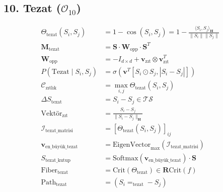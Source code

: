 \documentclass[11pt, a4paper]{article}
\begin{document}
\subsection{10. Tezat ($\mathcal{O}_{10}$)}
\begin{align}
\Theta_{\text{tezat}}(S_i, S_j) &= 1 - \cos(S_i, S_j) = 1 - \frac{\langle S_i, S_j \rangle_{\mathbf{H}}}{\|S_i\| \|S_j\|} \\
\mathbf{M}_{\text{tezat}} &= \mathbf{S} \cdot \mathbf{W}_{\text{opp}} \cdot \mathbf{S}^T \\
\mathbf{W}_{\text{opp}} &= -I_{d \times d} + \mathbf{v}_{\text{zıt}} \otimes \mathbf{v}_{\text{zıt}}^T \\
P(\text{Tezat} \mid S_i, S_j) &= \sigma\left( \mathbf{v}^T [S_i \odot S_j, |S_i - S_j|] \right) \\
\mathcal{C}_{\text{zıtlık}} &= \max_{i,j} \Theta_{\text{tezat}}(S_i, S_j) \\
\Delta S_{\text{tezat}} &= S_i - S_j \in \mathcal{T}\mathcal{S} \\
\text{Vektör}_{\text{zıt}} &= \frac{S_i - S_j}{\|S_i - S_j\|_{\mathbf{H}}} \\
\mathcal{I}_{\text{tezat\_matrisi}} &= \left[ \Theta_{\text{tezat}}(S_i, S_j) \right]_{ij} \\
\mathbf{v}_{\text{en\_büyük\_tezat}} &= \text{EigenVector}_{\max}(\mathcal{I}_{\text{tezat\_matrisi}}) \\
S_{\text{tezat\_kutup}} &= \text{Softmax}(\mathbf{v}_{\text{en\_büyük\_tezat}}) \cdot \mathbf{S} \\
\text{Fiber}_{\text{tezat}} &= \text{Crit}(\Theta_{\text{tezat}}) \in \mathbf{R}\text{Crit}(f) \\
\text{Path}_{\text{tezat}} &= (S_i =_{\text{tezat}} -S_j)
\end{align}
\end{document}
